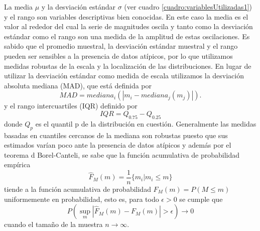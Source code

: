 \documentclass[letterpaper,12pt]{book}
\begin{document}
La media $\mu$ y la desviación estándar $\sigma$ (ver cuadro \ref{cuadro:variablesUtilizadas1})  y el rango son variables descriptivas bien conocidas. En este caso la media es el valor al rededor del cual la serie de magnitudes oscila y tanto como la desviación estándar como el rango son una medida de la amplitud de estas oscilaciones. Es sabido que el promedio muestral, la desviación estándar muestral y el rango pueden ser sensibles a la presencia de datos atípicos, por lo que utilizamos medidas robustas de la escala y la localización de las distribuciones. En lugar de utilizar la desviación estándar como medida de escala utilizamos la desviación absoluta mediana (MAD), que está definida por 
\begin{equation}
  MAD = mediana_i(|m_i-mediana_j(m_j)|).
\end{equation} 
y el rango intercuartiles (IQR) definido por
\begin{equation}
IQR = Q_{0.75}-Q_{0.25}
\end{equation}
donde $Q_p$ es el quantil p de la distribución en cuestión. Generalmente las medidas basadas en cuantiles cercanos de la mediana son robustas puesto que sus estimados varían poco ante la presencia de datos atípicos y además por el teorema d Borel-Canteli, se sabe que la función acumulativa de probabilidad empírica
\begin{equation}
  \hat{F}_{M}(m) = \frac{1}{n}\{m_i | m_i \leq m \}
\end{equation}
tiende a la función acumulativa de probabilidad $F_{M}(m) = P(M\leq m)$ uniformemente en probabilidad, esto es, para todo $\epsilon >0 $ se cumple que 
\begin{equation}
  P\left(\sup_m | \hat{F}_{M}(m)-F_M(m) | > \epsilon \right) \to 0
\end{equation}
cuando el tamaño de la muestra $n\to\infty$.
\end{document}
